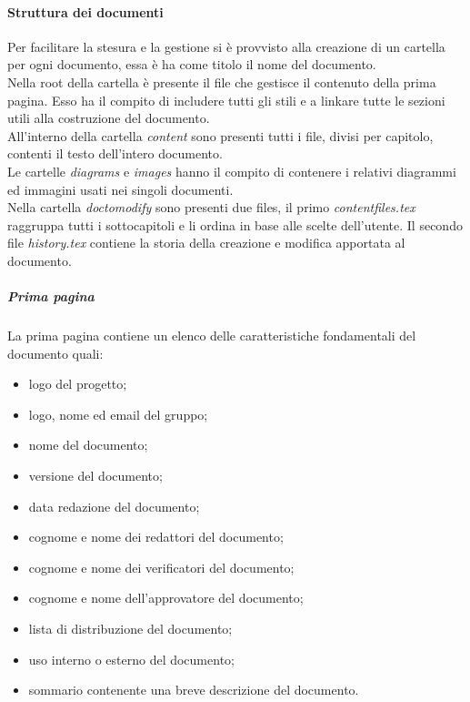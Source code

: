 			\paragraph{Struttura dei documenti}
			Per facilitare la stesura e la gestione si è provvisto alla creazione di un cartella per ogni documento, essa è ha come titolo il nome del documento.\\
			Nella root della cartella è presente il file che gestisce il contenuto della prima pagina. Esso ha il compito di includere tutti gli stili e a linkare tutte le sezioni utili alla costruzione del documento.\\
			All'interno della cartella \emph{content} sono presenti tutti i file, divisi per capitolo, contenti il testo dell'intero documento.\\
			Le cartelle \emph{diagrams} e \emph{images} hanno il compito di contenere i relativi diagrammi ed immagini usati nei singoli documenti.\\
			Nella cartella \emph{doc\textunderscore to\textunderscore modify} sono presenti due files, il primo \emph{content\textunderscore files.tex} raggruppa tutti i sottocapitoli e li ordina in base alle scelte dell'utente. Il secondo file \emph{history.tex} contiene la storia della creazione e modifica apportata al documento.

				\subparagraph{Prima pagina}
				La prima pagina contiene un elenco delle caratteristiche fondamentali del documento quali:
				\begin{itemize}
					\item logo del progetto;
					\item logo, nome ed email del gruppo; 
					\item nome del documento;
					\item versione del documento;
					\item data redazione del documento;
					\item cognome e nome dei redattori del documento;
					\item cognome e nome dei verificatori del documento;
					\item cognome e nome dell'approvatore del documento;
					\item lista di distribuzione del documento;
					\item uso interno o esterno del documento;
					\item sommario contenente una breve descrizione del documento.
				\end{itemize}
			
